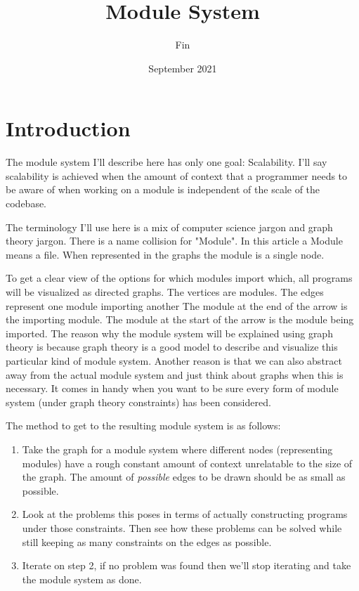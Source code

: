 \documentclass{article}
\title{Module System}
\author{Fin}
\date{September 2021}
\begin{document}
\maketitle

\section{Introduction}
The module system I'll describe here has only one goal: Scalability.
I'll say scalability is achieved when the amount of context that a programmer needs to be aware of when working on a module is independent of the scale of the codebase.

The terminology I'll use here is a mix of computer science jargon and graph theory jargon. There is a name collision for "Module". In this article a Module means a file. When represented in the graphs the module is a single node.

To get a clear view of the options for which modules import which, all programs will be visualized as directed graphs. 
The vertices are modules.
The edges represent one module importing another 
The module at the end of the arrow is the importing module. 
The module at the start of the arrow is the module being imported. 
The reason why the module system will be explained using graph theory is because graph theory is a good model to describe and visualize this particular kind of module system. Another reason is that we can also abstract away from the actual module system and just think about graphs when this is necessary. It comes in handy when you want to be sure every form of module system (under graph theory constraints) has been considered.


The method to get to the resulting module system is as follows:

\begin{enumerate}
    \item Take the graph for a module system where different nodes
(representing modules) have a rough constant amount of context unrelatable to the size of the graph. The amount of \emph{possible} edges to be drawn should be as small as possible.

    \item Look at the problems this poses in terms of actually constructing programs under those constraints. Then see how these problems can be solved while still keeping as many constraints on the edges as possible.
    
    \item Iterate on step 2, if no problem was found then we’ll stop iterating and take the module system as done.
\end{enumerate}
\end{document}

